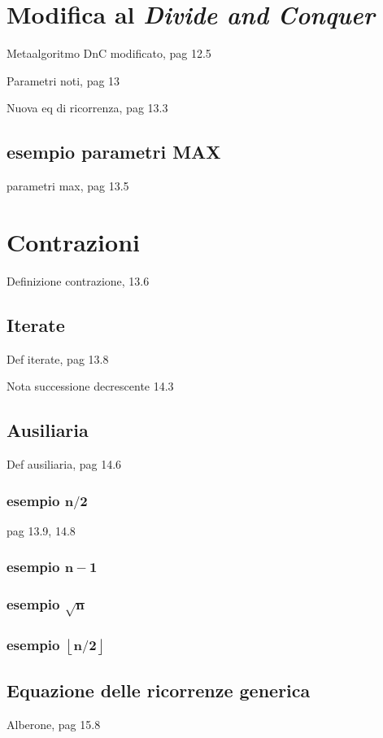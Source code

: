 \section{Modifica al \textit{Divide and Conquer}}
Metaalgoritmo DnC modificato, pag 12.5

Parametri noti, pag 13

Nuova eq di ricorrenza, pag 13.3

\subsection{esempio parametri MAX}
parametri max, pag 13.5

\section{Contrazioni}
Definizione contrazione, 13.6

\subsection{Iterate}
Def iterate, pag 13.8

Nota successione decrescente 14.3

\subsection{Ausiliaria}
Def ausiliaria, pag 14.6

\subsubsection{ esempio $\bm{n/2}$}
pag 13.9, 14.8

\subsubsection{ esempio $\bm{n-1}$}
\subsubsection{ esempio $\bm{\sqrt{n}}$}
\subsubsection{ esempio $\bm{\left\lfloor n/2 \right\rfloor}$}

\subsection{Equazione delle ricorrenze generica}
Alberone, pag 15.8

